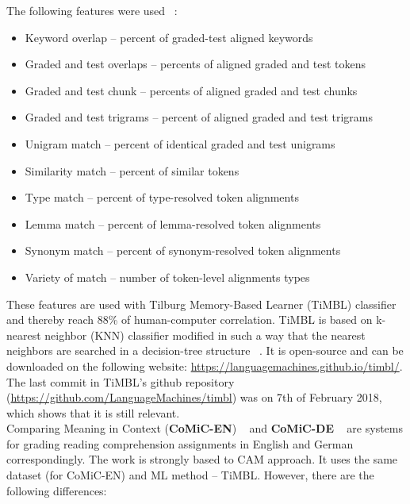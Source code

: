 \documentclass[11pt]{report}
\numberwithin{equation}{section} %
\begin{document}
 The following features were used ~\cite{CAM}:
\begin{itemize}
\item Keyword overlap -- percent of graded-test aligned keywords 
\item Graded and test overlaps -- percents of aligned graded and test tokens 
\item Graded and test chunk -- percents of aligned graded and test chunks
\item Graded and test trigrams -- percent of aligned graded and test trigrams
\item Unigram match -- percent of identical graded and test unigrams
\item Similarity match -- percent of similar tokens
\item Type match -- percent of type-resolved token alignments
\item Lemma match -- percent of lemma-resolved token alignments
\item Synonym match -- percent of synonym-resolved token alignments
\item Variety of match -- number of token-level alignments types
\end{itemize}

These features are used with Tilburg Memory-Based Learner (TiMBL) classifier and thereby reach 88\% of human-computer correlation. TiMBL is based on k-nearest neighbor (KNN) classifier modified in such a way that the nearest neighbors are searched in a decision-tree structure ~\cite{TiMBL}. It is open-source and can be downloaded on the following website: \url{https://languagemachines.github.io/timbl/}. The last commit in TiMBL's github repository (\url{https://github.com/LanguageMachines/timbl}) was on 7th of February 2018, which shows that it is still relevant. \\

Comparing Meaning in Context (\textbf{CoMiC-EN}) ~\cite{CoMiC-EN} and \textbf{CoMiC-DE} ~\cite{CoMiC-DE} are systems for grading reading comprehension assignments in English and German correspondingly. The work is strongly based to CAM approach. It uses the same dataset (for CoMiC-EN) and ML method -- TiMBL. However, there are the following differences:
\end{document}
